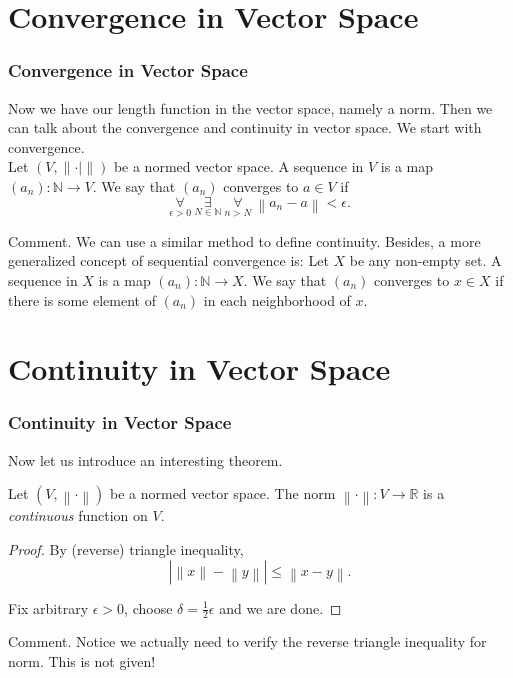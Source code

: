 \documentclass[12pt, t]{beamer}
\renewcommand{\emph}[1]{{\color{Turquoise3}\textsl{#1}}}
\begin{document}
\section{Convergence in Vector Space}
\begin{frame}
    \frametitle{Convergence in Vector Space}
    Now we have our length function in the vector space, namely a norm. Then we can talk about the convergence and continuity in vector space. We start with convergence.\\
    \vspace{1em}
    \hspace{1em}
    Let $(V, \left\lVert \cdot|\right\rVert )$ be a normed vector space. A sequence in $V$ is a map $(a_n)\colon \mathbb{N}\rightarrow V$. We say that $(a_n)$ converges to $a\in V$ if
    \begin{equation*}
        \underset{\epsilon>0}{\forall}\ \underset{N\in\mathbb{N}}{\exists}\ \underset{n>N}{\forall}\ \left\lVert a_n-a \right\rVert <\epsilon.
    \end{equation*}

    \vspace{1em}
    Comment. We can use a similar method to define continuity. Besides, a more generalized concept of sequential convergence is: Let $X$ be any non-empty set.
    A sequence in $X$ is a map $(a_n)\colon \mathbb{N}\rightarrow X$. We say that $(a_n)$  converges to $x\in X$ if there is some element of $(a_n)$ in each neighborhood of $x$.

\end{frame}

\section{Continuity in Vector Space}
\begin{frame}
    \frametitle{Continuity in Vector Space}
    Now let us introduce an interesting theorem.

    \begin{theorem}
        Let $(V,\left\lVert \cdot \right\rVert)$ be a normed vector space. The norm \(\left\lVert \cdot \right\rVert:V\rightarrow \mathbb{R}\)
        is a \emph{continuous} function on $V$.
    \end{theorem}

    \begin{proof}
        By (reverse) triangle inequality,
        \begin{equation*}
            \left\vert \left\lVert x\right\rVert - \left\lVert y\right\rVert \right\vert\leq \left\lVert x-y\right\rVert .
        \end{equation*}

        Fix arbitrary $\epsilon>0$, choose $\delta=\frac{1}{2}\epsilon$ and we are done.
    \end{proof}

    Comment. Notice we actually need to verify the reverse triangle inequality for norm. This is not given!
\end{frame}
\end{document}
